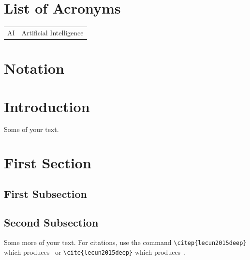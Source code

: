\documentclass{xai-thesis}
\begin{document}
\section*{List of Acronyms}
\begin{tabular}{@{}ll}
AI & Artificial Intelligence\\
\end{tabular}

\clearpage
\section*{Notation}



\cleardoublepage
\pagestyle{headings}
\setcounter{page}{1}


\section{Introduction}
\label{sec:intro}

Some of your text.

\section{First Section}
\label{sec:first}


\subsection{First Subsection}
\label{subsec:first}


\subsection{Second Subsection}
\label{subsec:second}

Some more of your text. For citations, use the command \verb+\citep{lecun2015deep}+ which produces~\citep{lecun2015deep} or \verb+\cite{lecun2015deep}+ which produces~\cite{lecun2015deep}.
\end{document}
